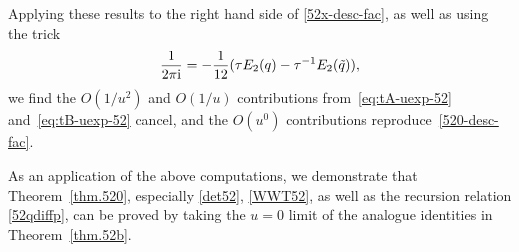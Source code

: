 \documentclass[12pt,reqno]{amsart}
\theoremstyle{definition}
\def\tq{\tilde{q}}
\def\ri{\mathrm{i}}
\def\wt{\widetilde}
\def\ri{{\rm i}}
\begin{document}
Applying these results to the right hand side of \eqref{52x-desc-fac},
as well as using the trick
\begin{equation}
  \frac{1}{2\pi\ri} = -\frac{1}{12}(\tau E_2(q) - \tau^{-1}E_2(\tq)),
\end{equation}
we find the $O(1/u^2)$ and $O(1/u)$
contributions from~\eqref{eq:tA-uexp-52} and~\eqref{eq:tB-uexp-52}
cancel, and the $O(u^0)$ contributions reproduce~\eqref{520-desc-fac}.

As an application of the above computations, we demonstrate that
Theorem~\ref{thm.520}, especially \eqref{det52}, \eqref{WWT52}, as
well as the recursion relation \eqref{52qdiffp}, can be proved by
taking the $u=0$ limit of the analogue identities in
Theorem~\ref{thm.52b}.
\end{document}
